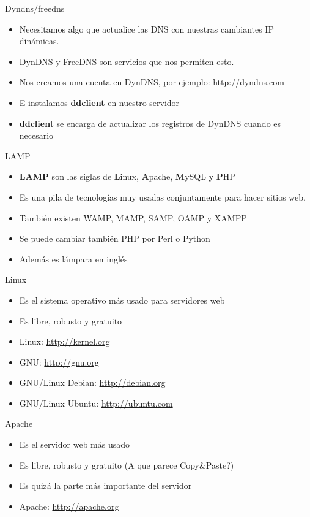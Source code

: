 \documentclass[spanish]{beamer}
\begin{document}
\begin{frame}{Dyndns/freedns}
\begin{itemize}
\item Necesitamos algo que actualice las DNS con nuestras cambiantes IP 
dinámicas.
\item DynDNS y FreeDNS son servicios que nos permiten esto.
\item Nos creamos una cuenta en DynDNS, por ejemplo: \url{http://dyndns.com}
\item E instalamos \textbf{ddclient} en nuestro servidor
\item \textbf{ddclient} se encarga de actualizar los registros de DynDNS
cuando es necesario
\end{itemize}
\end{frame}
\begin{frame}{LAMP}
\begin{itemize}
\item \textbf{LAMP} son las siglas de \textbf{L}inux, \textbf{A}pache, \textbf{M}ySQL y \textbf{P}HP
\item Es una pila de tecnologías muy usadas conjuntamente para hacer sitios web.
\item También existen WAMP, MAMP, SAMP, OAMP y XAMPP
\item Se puede cambiar también PHP por Perl o Python
\item Además es lámpara en inglés
\end{itemize}
\end{frame}
\begin{frame}{Linux}
\begin{itemize}
\item Es el sistema operativo más usado para servidores web
\item Es libre, robusto y gratuito
\item Linux: \url{http://kernel.org}
\item GNU: \url{http://gnu.org}
\item GNU/Linux Debian: \url{http://debian.org}
\item GNU/Linux Ubuntu: \url{http://ubuntu.com}
\end{itemize}
\end{frame}
\begin{frame}{Apache}
\begin{itemize}
\item Es el servidor web más usado
\item Es libre, robusto y gratuito (A que parece Copy\&Paste?)
\item Es quizá la parte más importante del servidor
\item Apache: \url{http://apache.org}
\end{itemize}
\end{frame}
\end{document}
